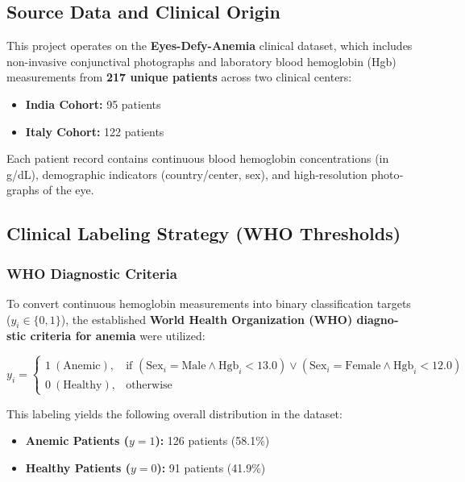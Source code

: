 \documentclass{article}
\begin{document}
\begin{latin}
		\subsection{Source Data and Clinical Origin}
		This project operates on the \textbf{Eyes-Defy-Anemia} clinical dataset, which includes non-invasive conjunctival photographs and laboratory blood hemoglobin (Hgb) measurements from \textbf{217 unique patients} across two clinical centers:
		\begin{itemize}
			\item \textbf{India Cohort:} 95 patients
			\item \textbf{Italy Cohort:} 122 patients
		\end{itemize}
		Each patient record contains continuous blood hemoglobin concentrations (in g/dL), demographic indicators (country/center, sex), and high-resolution photographs of the eye.
		
		\subsection{Clinical Labeling Strategy (WHO Thresholds)}
		
		\subsubsection{WHO Diagnostic Criteria}
		To convert continuous hemoglobin measurements into binary classification targets ($y_i \in \{0, 1\}$), the established \textbf{World Health Organization (WHO) diagnostic criteria for anemia} were utilized:
		
		\begin{equation}
			y_i = \begin{cases} 
				1 \ (\text{Anemic}), & \text{if } (\text{Sex}_i = \text{Male} \land \text{Hgb}_i < 13.0) \lor (\text{Sex}_i = \text{Female} \land \text{Hgb}_i < 12.0) \\ 
				0 \ (\text{Healthy}), & \text{otherwise} 
			\end{cases}
		\end{equation}
		
		This labeling yields the following overall distribution in the dataset:
		\begin{itemize}
			\item \textbf{Anemic Patients ($y=1$):} 126 patients (58.1\%)
			\item \textbf{Healthy Patients ($y=0$):} 91 patients (41.9\%)
		\end{itemize}
		

\end{latin}
\end{document}
